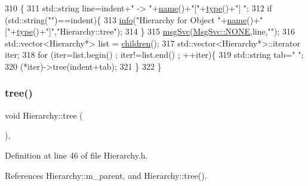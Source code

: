 \begin{DoxyCode}
310                                     \{
311   std::string line=indent+\textcolor{stringliteral}{" -> "}+\hyperlink{classObject_a300f4c05dd468c7bb8b3c968868443c1}{name}()+\textcolor{stringliteral}{"["}+\hyperlink{classObject_a84f99f70f144a83e1582d1d0f84e4e62}{type}()+\textcolor{stringliteral}{"] "};
312   \textcolor{keywordflow}{if} (std::string(\textcolor{stringliteral}{""})==indent)\{
313     \hyperlink{classObject_a644fd329ea4cb85f54fa6846484b84a8}{info}(\textcolor{stringliteral}{"Hierarchy for Object "}+\hyperlink{classObject_a300f4c05dd468c7bb8b3c968868443c1}{name}()+\textcolor{stringliteral}{"["}+\hyperlink{classObject_a84f99f70f144a83e1582d1d0f84e4e62}{type}()+\textcolor{stringliteral}{"]"},\textcolor{stringliteral}{"Hierarchy::tree"});
314   \}
315   \hyperlink{classObject_a3f9d5537ebce0c0f2bf6ae4d92426f3c}{msgSvc}(\hyperlink{classMsgSvc_ae671eb7301996cd049d2da8a65925926a9be9ae32fed8e1e6eba4a58692210fbd}{MsgSvc::NONE},line,\textcolor{stringliteral}{""});
316   std::vector<Hierarchy*> list = \hyperlink{classHierarchy_aa9a76f69e98e052ee1a6e32cea006288}{children}();
317   std::vector<Hierarchy*>::iterator iter;
318   \textcolor{keywordflow}{for} (iter=list.begin() ; iter!=list.end() ; ++iter)\{
319     std::string tab=\textcolor{stringliteral}{"  "};
320     (*iter)->tree(indent+tab);
321   \}
322 \}
\end{DoxyCode}
\mbox{\label{classHierarchy_a594c294c5f60c230e106d522ed008212}} 
\subsubsection{\texorpdfstring{tree()}{tree()}\hspace{0.1cm}{\footnotesize\ttfamily [2/2]}}
{\footnotesize\ttfamily void Hierarchy\+::tree (\begin{DoxyParamCaption}{ }\end{DoxyParamCaption})\hspace{0.3cm}{\ttfamily [inline]}, {\ttfamily [inherited]}}



Definition at line 46 of file Hierarchy.\+h.



References Hierarchy\+::m\+\_\+parent, and Hierarchy\+::tree().



